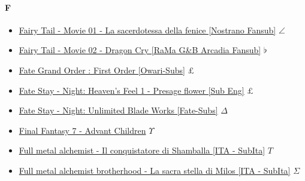 		\paragraph{F} \hypertarget{FF}{}
			\begin{itemize}
				
				\item \href{https://mega.nz/#F!o2g2RaxJ!SewoPB8hH_Y-puhmTMMejQ} {Fairy Tail - Movie 01 - La sacerdotessa della fenice [Nostrano Fansub]}  $\angle$   \\ 
				\item \href{https://mega.nz/#!gjxRRYLS!Hi6omAApVd5_tfXFSfxIlSe4ez1aaSHQgHxOjc0o4L8} {Fairy Tail - Movie 02 - Dragon Cry [RaMa G\&B Arcadia Fansub]}  $\flat$   \\ 
				\item \href{https://mega.nz/#!m7ATDQhT!tksv4t6CvPedCTZ5xA0bqr2fLigo_ajciadxMCLGdV0} {Fate Grand Order : First Order [Owari-Subs]}  $\pounds$   \\ 
				\item \href{https://mega.nz/#!izBAXQ4Q!4xNtshKFzRVkop5CnbFoTdQ7954YB92BMGJSXDJ-w6c} {Fate Stay - Night: Heaven's Feel 1 - Presage flower [Sub Eng]}  $\pounds$   \\ 
				\item \href{https://mega.nz/#F!HMIwwTRT!7Qq_UyPDUrKxsUvwR17tvw} {Fate Stay - Night: Unlimited Blade Works [Fate-Subs]}  $\Delta$   \\ 
				\item \href{https://mega.nz/#!EixhFJqQ!SK_45Ni4dXvSexglSdZZsp9aR_nXhO0Are6BZkFlrI8} {Final Fantasy 7 - Advant Children}  $\Upsilon$   \\ 
				\item \href{https://mega.nz/#!JiYQFRJD!I4cTsl3GxElhUehEmWryrShUH3QhsUXgqv8DKh0cLVg} {Full metal alchemist - Il conquistatore di Shamballa [ITA - SubIta]}  $T$   \\ 
				\item \href{https://mega.nz/#!Y2xDxIBL!XmwZWeB8ruBJv9Yktumy3-gNsJuXyziF8gaIT6d54EE} {Full metal alchemist brotherhood - La sacra stella di Milos [ITA - SubIta]}  $\Sigma$   \\ 
			
		\end{itemize}	
		
		
		
